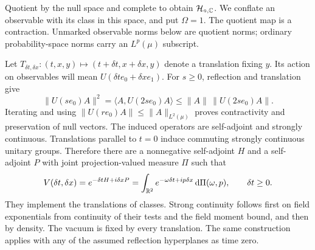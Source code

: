 Quotient by the null space and complete to obtain $\mathcal{H}_{\circ,\mathbb{C}}$.
We conflate an observable with its class in this space, and put $\Omega=1$.
The quotient map is a contraction. Unmarked observable norms below are quotient
norms; ordinary probability-space norms carry an $L^p(\mu)$ subscript.

Let $T_{\delta t,\delta x}:(t,x,y)\mapsto
(t+\delta t,x+\delta x,y)$ denote a translation fixing $y$.
Its action on observables will mean $U(\delta t e_0+\delta x e_1)$.
For $s\geq0$, reflection and translation give
\begin{equation}
 \|U(se_0)A\|^2=\langle A,U(2se_0)A\rangle
 \leq\|A\|\,\|U(2se_0)A\|.
\end{equation}
Iterating and using $\|U(re_0)A\|\leq\|A\|_{L^2(\mu)}$ proves
contractivity and preservation of null vectors. The induced operators
are self-adjoint and strongly continuous. Translations parallel to
$t=0$ induce commuting strongly continuous unitary groups. Therefore
there are a nonnegative self-adjoint $H$ and a self-adjoint $P$ with
joint projection-valued measure $\Pi$ such that
\begin{equation}\label{eq:spectral-translations}
 V(\delta t,\delta x)=e^{-\delta tH+i\delta xP}
 =\int_{\mathbb{R}^2}e^{-\omega\delta t+ip\delta x}\,\mathrm{d}\Pi(\omega,p),
 \qquad\delta t\geq0.
\end{equation}
They implement the translations of classes. Strong continuity follows
first on field exponentials from continuity of their tests and the
field moment bound, and then by density. The vacuum is fixed by every
translation. The same construction applies with any of the assumed
reflection hyperplanes as time zero.


